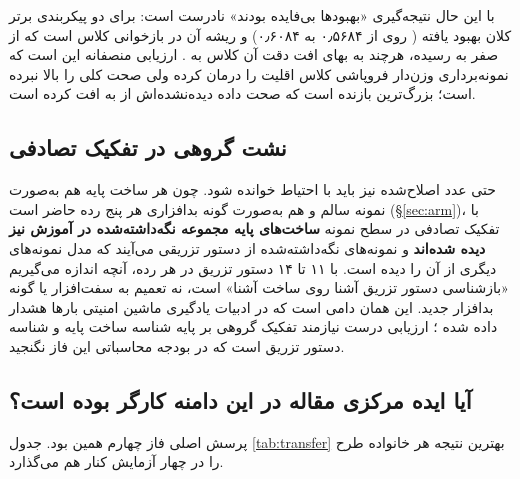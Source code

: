 با این حال نتیجه‌گیری «بهبود‌ها بی‌فایده بودند» نادرست است: برای دو پیکربندی برتر  کلان بهبود یافته ( روی  از \num{۰٫۵۶۸۴} به \num{۰٫۶۰۸۴}) و ریشه آن در بازخوانی کلاس  است که از صفر به  رسیده، هرچند به بهای افت دقت آن کلاس به . ارزیابی منصفانه این است که نمونه‌برداری وزن‌دار فروپاشی کلاس اقلیت را درمان کرده ولی صحت کلی را بالا نبرده است؛ بزرگ‌ترین بازنده  است که صحت داده دیده‌نشده‌اش از  به  افت کرده است.

\subsection{نشت گروهی در تفکیک تصادفی}
حتی عدد اصلاح‌شده  نیز باید با احتیاط خوانده شود. چون هر ساخت پایه هم به‌صورت نمونه سالم و هم به‌صورت گونه بدافزاری هر پنج رده حاضر است (\S\ref{sec:arm})، با تفکیک تصادفی در سطح نمونه \textbf{ ساخت‌های پایه مجموعه نگه‌داشته‌شده در آموزش نیز دیده شده‌اند} و  نمونه‌های نگه‌داشته‌شده از دستور تزریقی می‌آیند که مدل نمونه‌های دیگری از آن را دیده است. با ۱۱ تا ۱۴ دستور تزریق در هر رده، آنچه اندازه می‌گیریم «بازشناسی دستور تزریق آشنا روی ساخت آشنا» است، نه تعمیم به سفت‌افزار یا گونه بدافزار جدید. این همان دامی است که در ادبیات یادگیری ماشین امنیتی بار‌ها هشدار داده شده \cite{arp2022dodo, pendlebury2019tesseract}؛ ارزیابی درست نیازمند تفکیک گروهی بر پایه شناسه ساخت پایه و شناسه دستور تزریق است که در بودجه محاسباتی این فاز نگنجید.

\subsection{آیا ایده مرکزی مقاله در این دامنه کارگر بوده است؟}
\label{sub:transfer}
پرسش اصلی فاز چهارم همین بود. جدول \ref{tab:transfer} بهترین نتیجه هر خانواده طرح را در چهار آزمایش کنار هم می‌گذارد.

